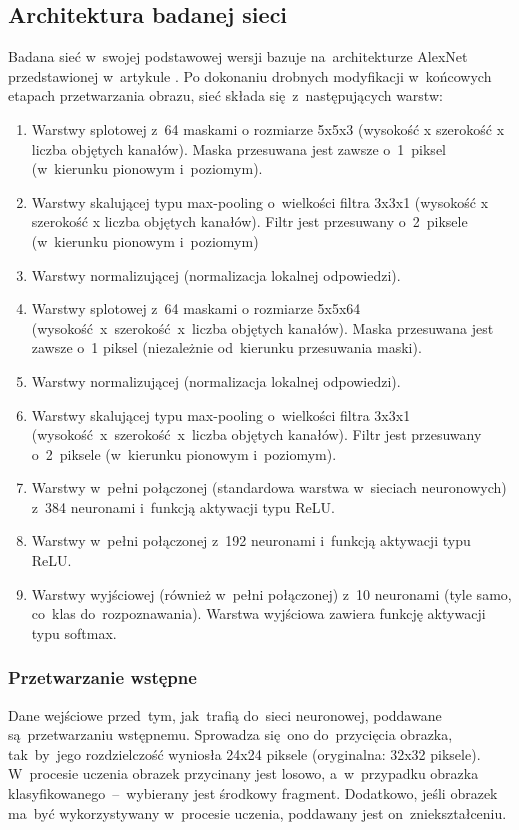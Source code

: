 \subsection{Architektura badanej sieci}
Badana sieć w~swojej podstawowej wersji bazuje na~architekturze AlexNet przedstawionej w~artykule \cite{AlexNet}.
Po dokonaniu drobnych modyfikacji w~końcowych etapach przetwarzania obrazu, sieć składa się~z~następujących warstw:
\begin{enumerate}
    \item Warstwy splotowej z~64 maskami o rozmiarze 5x5x3 (wysokość x szerokość x liczba objętych kanałów).
          Maska przesuwana jest zawsze o~1~piksel (w~kierunku pionowym i~poziomym).
    \item Warstwy skalującej typu max-pooling o~wielkości filtra 3x3x1 (wysokość x szerokość x liczba objętych kanałów).
          Filtr jest przesuwany o~2~piksele (w~kierunku pionowym i~poziomym)
    \item Warstwy normalizującej (normalizacja lokalnej odpowiedzi).
    \item Warstwy splotowej z~64 maskami o rozmiarze 5x5x64 (wysokość~x~szerokość~x~liczba objętych kanałów).
          Maska przesuwana jest zawsze o~1 piksel (niezależnie od~kierunku przesuwania maski).
    \item Warstwy normalizującej (normalizacja lokalnej odpowiedzi).
    \item Warstwy skalującej typu max-pooling o~wielkości filtra 3x3x1 (wysokość~x~szerokość~x~liczba objętych kanałów).
          Filtr jest przesuwany o~2~piksele (w~kierunku pionowym i~poziomym).
    \item Warstwy w~pełni połączonej (standardowa warstwa w~sieciach neuronowych) z~384 neuronami i~funkcją aktywacji
          typu ReLU.
    \item Warstwy w~pełni połączonej z~192 neuronami i~funkcją aktywacji
          typu ReLU.
    \item Warstwy wyjściowej (również w~pełni połączonej) z~10 neuronami (tyle samo, co~klas do~rozpoznawania).
          Warstwa wyjściowa zawiera funkcję aktywacji typu softmax.
\end{enumerate}

\subsubsection{Przetwarzanie wstępne}
Dane wejściowe przed~tym, jak~trafią do~sieci neuronowej, poddawane są~przetwarzaniu wstępnemu. Sprowadza się~ono
do~przycięcia obrazka, tak~by~jego rozdzielczość wyniosła 24x24 piksele (oryginalna: 32x32 piksele). W~procesie
uczenia obrazek przycinany jest losowo, a~w~przypadku obrazka klasyfikowanego~--~wybierany jest środkowy fragment.
Dodatkowo, jeśli obrazek ma~być wykorzystywany w~procesie uczenia, poddawany jest on~zniekształceniu.


